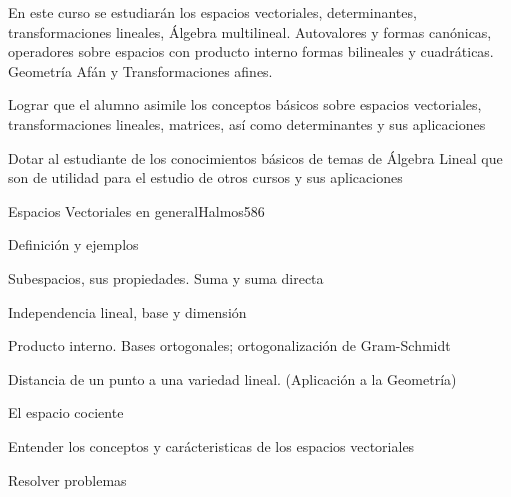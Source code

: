 
\begin{syllabus}


\begin{justification}
En este curso se estudiarán los espacios vectoriales, determinantes, transformaciones lineales, Álgebra multilineal.
Autovalores y formas canónicas, operadores sobre espacios con producto interno formas bilineales y cuadráticas. Geometría Afán y Transformaciones afines.
\end{justification}

\begin{goals}
\item  Lograr que el alumno asimile los conceptos básicos sobre espacios vectoriales, transformaciones lineales, matrices, así­ como determinantes y sus aplicaciones
\item  Dotar al estudiante de los conocimientos básicos de temas de Álgebra Lineal que son de utilidad para el estudio de otros cursos y sus aplicaciones
\end{goals}

\begin{outcomes}
\end{outcomes}

\begin{unit}{Espacios Vectoriales en general}{Halmos58}{6}
   \begin{topics}
         \item  Definición y ejemplos
	 \item  Subespacios, sus propiedades. Suma y suma directa
         \item  Independencia lineal, base y dimensión
	 \item  Producto interno. Bases ortogonales; ortogonalización de Gram-Schmidt
         \item  Distancia de un punto a una variedad lineal. (Aplicación a la Geometría)
         \item  El espacio cociente
   \end{topics}

   \begin{unitgoals}
         \item  Entender los conceptos y carácteristicas de los espacios vectoriales
         \item  Resolver problemas
   \end{unitgoals}
\end{unit}


\end{syllabus}
